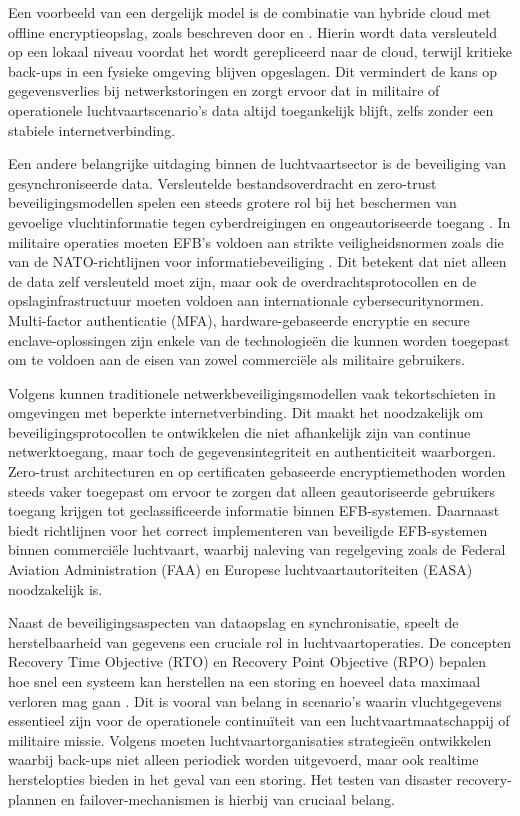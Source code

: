 Een voorbeeld van een dergelijk model is de combinatie van hybride cloud met offline encryptieopslag, zoals beschreven door \textcite{MicrosoftBackup} en \textcite{AWSBackup}. Hierin wordt data versleuteld op een lokaal niveau voordat het wordt gerepliceerd naar de cloud, terwijl kritieke back-ups in een fysieke omgeving blijven opgeslagen. Dit vermindert de kans op gegevensverlies bij netwerkstoringen en zorgt ervoor dat in militaire of operationele luchtvaartscenario’s data altijd toegankelijk blijft, zelfs zonder een stabiele internetverbinding.

Een andere belangrijke uitdaging binnen de luchtvaartsector is de beveiliging van gesynchroniseerde data. Versleutelde bestandsoverdracht en zero-trust beveiligingsmodellen spelen een steeds grotere rol bij het beschermen van gevoelige vluchtinformatie tegen cyberdreigingen en ongeautoriseerde toegang \autocite{NISTFIPS140, ACISAPGSECVEIL001}. In militaire operaties moeten EFB’s voldoen aan strikte veiligheidsnormen zoals die van de NATO-richtlijnen voor informatiebeveiliging \autocite{AD070001}. Dit betekent dat niet alleen de data zelf versleuteld moet zijn, maar ook de overdrachtsprotocollen en de opslaginfrastructuur moeten voldoen aan internationale cybersecuritynormen. Multi-factor authenticatie (MFA), hardware-gebaseerde encryptie en secure enclave-oplossingen zijn enkele van de technologieën die kunnen worden toegepast om te voldoen aan de eisen van zowel commerciële als militaire gebruikers.

Volgens \textcite{VinayakBhuvi} kunnen traditionele netwerkbeveiligingsmodellen vaak tekortschieten in omgevingen met beperkte internetverbinding. Dit maakt het noodzakelijk om beveiligingsprotocollen te ontwikkelen die niet afhankelijk zijn van continue netwerktoegang, maar toch de gegevensintegriteit en authenticiteit waarborgen. Zero-trust architecturen en op certificaten gebaseerde encryptiemethoden worden steeds vaker toegepast om ervoor te zorgen dat alleen geautoriseerde gebruikers toegang krijgen tot geclassificeerde informatie binnen EFB-systemen. Daarnaast biedt \textcite{FAA_AC91-78A} richtlijnen voor het correct implementeren van beveiligde EFB-systemen binnen commerciële luchtvaart, waarbij naleving van regelgeving zoals de Federal Aviation Administration (FAA) en Europese luchtvaartautoriteiten (EASA) noodzakelijk is.

Naast de beveiligingsaspecten van dataopslag en synchronisatie, speelt de herstelbaarheid van gegevens een cruciale rol in luchtvaartoperaties. De concepten Recovery Time Objective (RTO) en Recovery Point Objective (RPO) bepalen hoe snel een systeem kan herstellen na een storing en hoeveel data maximaal verloren mag gaan \autocite{VeeamRTO}. Dit is vooral van belang in scenario’s waarin vluchtgegevens essentieel zijn voor de operationele continuïteit van een luchtvaartmaatschappij of militaire missie. Volgens \textcite{Abdelaziz48PP100_116} moeten luchtvaartorganisaties strategieën ontwikkelen waarbij back-ups niet alleen periodiek worden uitgevoerd, maar ook realtime herstelopties bieden in het geval van een storing. Het testen van disaster recovery-plannen en failover-mechanismen is hierbij van cruciaal belang.

